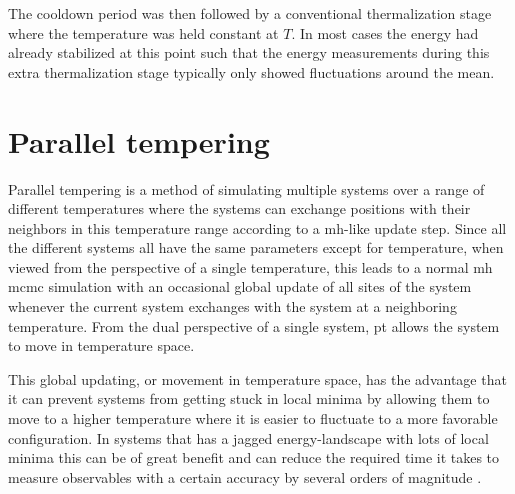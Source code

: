 The cooldown period was then followed by a conventional thermalization stage where the temperature was held constant at $T$. In
most cases the energy had already stabilized at this point such that the energy measurements during this extra thermalization
stage typically only showed fluctuations around the mean.


\section{Parallel tempering}

Parallel tempering is a method of simulating multiple systems over a range of different temperatures where the systems can exchange
positions with their neighbors in this temperature range according to a \ac{mh}-like update step. Since all the different systems all have the same parameters
except for temperature, when viewed from the perspective of a single temperature, this leads to a normal \ac{mh} \ac{mcmc}
simulation with an occasional global update of all sites of the system whenever the current system exchanges with the system at a neighboring
temperature. From the dual perspective of a single system, \ac{pt} allows the system to move in temperature space.

This global updating, or movement in temperature space, has the advantage that it can prevent systems from getting stuck in local minima
by allowing them to move to a higher temperature where it is easier to fluctuate to a more favorable configuration. In systems that
has a jagged energy-landscape with lots of local minima this can be of great benefit and can reduce the required time it takes
to measure observables with a certain accuracy by several orders of magnitude \cite{Katzgraber09}.

